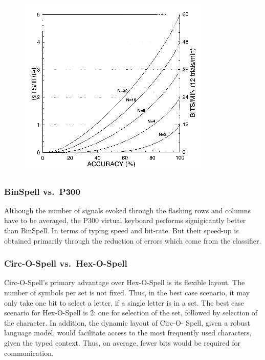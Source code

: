 \documentclass[12pt,titlepage]{article}
\begin{document}
\begin{figure}[h]
\begin{center}
	\includegraphics[scale=0.40]{fig12.jpg}
	\label{fig:itrvsacc}
\end{center}
\end{figure}

\subsubsection{BinSpell vs.\ P300}

Although the number of signals evoked through the flashing rows and columns have to be averaged, the P300 virtual keyboard performs signigicantly better than BinSpell.  In terms of typing speed and bit-rate.  But their speed-up is obtained primarily through the reduction of errors which come from the classifier.

\subsubsection{Circ-O-Spell vs.\ Hex-O-Spell}

Circ-O-Spell's primary advantage over Hex-O-Spell is its flexible layout.  The number of 
symbols per set is not fixed.  Thus, in the best case scenario, it may only take one bit to select a 
letter, if a single letter is in a set.  The best case scenario for Hex-O-Spell is 2: one for selection 
of the set, followed by selection of the character.  In addition, the dynamic layout of Circ-O- 
Spell, given a robust language model, would facilitate access to the most frequently used 
characters, given the typed context.  Thus, on average, fewer bits would be required for 
communication.
\end{document}
